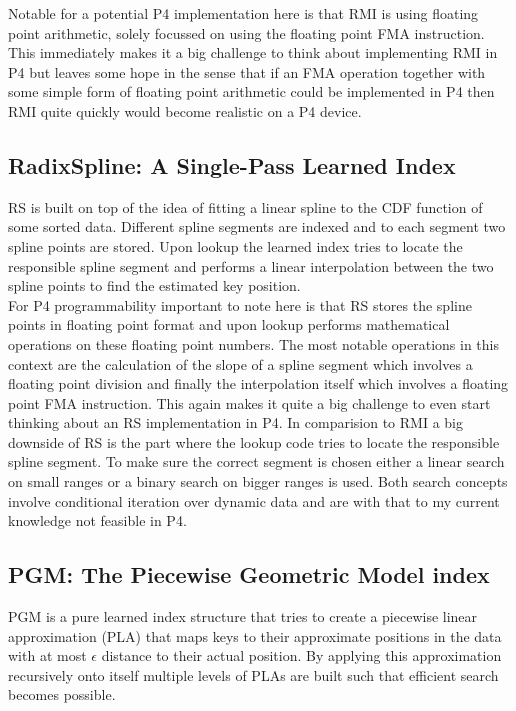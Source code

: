 Notable for a potential P4 implementation here is that RMI is using floating point arithmetic, solely focussed on using the floating point FMA instruction. This immediately makes it a big challenge to think about implementing RMI in P4 but leaves some hope in the sense that if an FMA operation together with some simple form of floating point arithmetic could be implemented in P4 then RMI quite quickly would become realistic on a P4 device.

\subsection{RadixSpline: A Single-Pass Learned Index}
RS \cite{radixspline} is built on top of the idea of fitting a linear spline to the CDF function of some sorted data. Different spline segments are indexed and to each segment two spline points are stored. Upon lookup the learned index tries to locate the responsible spline segment and performs a linear interpolation between the two spline points to find the estimated key position.\\

For P4 programmability important to note here is that RS stores the spline points in floating point format and upon lookup performs mathematical operations on these floating point numbers. The most notable operations in this context are the calculation of the slope of a spline segment which involves a floating point division and finally the interpolation itself which involves a floating point FMA instruction. This again makes it quite a big challenge to even start thinking about an RS implementation in P4. In comparision to RMI a big downside of RS is the part where the lookup code tries to locate the responsible spline segment. To make sure the correct segment is chosen either a linear search on small ranges or a binary search on bigger ranges is used. Both search concepts involve conditional iteration over dynamic data and are with that to my current knowledge not feasible in P4.

\subsection{PGM: The Piecewise Geometric Model index}
PGM \cite{pgm} is a pure learned index structure that tries to create a piecewise linear approximation (PLA) that maps keys to their approximate positions in the data with at most $\epsilon$ distance to their actual position. By applying this approximation recursively onto itself multiple levels of PLAs are built such that efficient search becomes possible.\\

